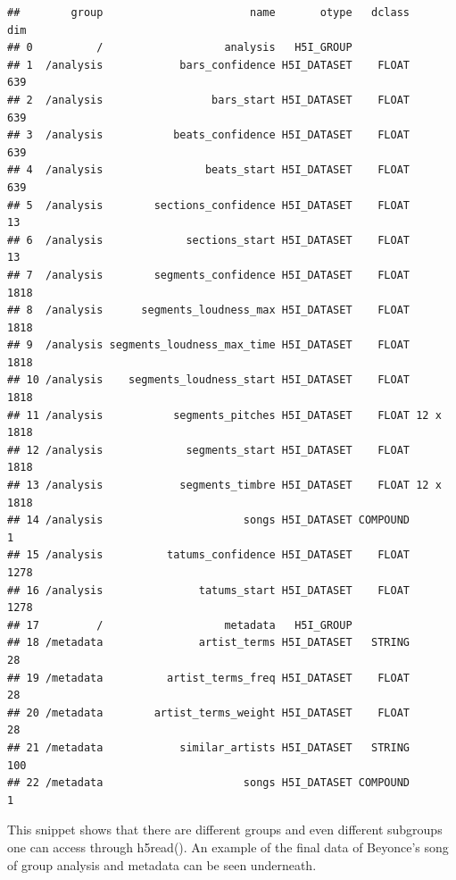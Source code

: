 \documentclass[]{article}
\begin{document}
\begin{verbatim}
##        group                       name       otype   dclass       dim
## 0          /                   analysis   H5I_GROUP                   
## 1  /analysis            bars_confidence H5I_DATASET    FLOAT       639
## 2  /analysis                 bars_start H5I_DATASET    FLOAT       639
## 3  /analysis           beats_confidence H5I_DATASET    FLOAT       639
## 4  /analysis                beats_start H5I_DATASET    FLOAT       639
## 5  /analysis        sections_confidence H5I_DATASET    FLOAT        13
## 6  /analysis             sections_start H5I_DATASET    FLOAT        13
## 7  /analysis        segments_confidence H5I_DATASET    FLOAT      1818
## 8  /analysis      segments_loudness_max H5I_DATASET    FLOAT      1818
## 9  /analysis segments_loudness_max_time H5I_DATASET    FLOAT      1818
## 10 /analysis    segments_loudness_start H5I_DATASET    FLOAT      1818
## 11 /analysis           segments_pitches H5I_DATASET    FLOAT 12 x 1818
## 12 /analysis             segments_start H5I_DATASET    FLOAT      1818
## 13 /analysis            segments_timbre H5I_DATASET    FLOAT 12 x 1818
## 14 /analysis                      songs H5I_DATASET COMPOUND         1
## 15 /analysis          tatums_confidence H5I_DATASET    FLOAT      1278
## 16 /analysis               tatums_start H5I_DATASET    FLOAT      1278
## 17         /                   metadata   H5I_GROUP                   
## 18 /metadata               artist_terms H5I_DATASET   STRING        28
## 19 /metadata          artist_terms_freq H5I_DATASET    FLOAT        28
## 20 /metadata        artist_terms_weight H5I_DATASET    FLOAT        28
## 21 /metadata            similar_artists H5I_DATASET   STRING       100
## 22 /metadata                      songs H5I_DATASET COMPOUND         1
\end{verbatim}

This snippet shows that there are different groups and even different
subgroups one can access through h5read(). An example of the final data
of Beyonce's song of group analysis and metadata can be seen underneath.
\end{document}
